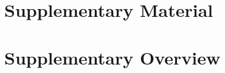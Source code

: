 \clearpage
\appendix

\setcounter{page}{1}
\setcounter{linenumber}{1}

\section*{\LARGE Supplementary Material}
\label{supp}


\section{Supplementary Overview}

